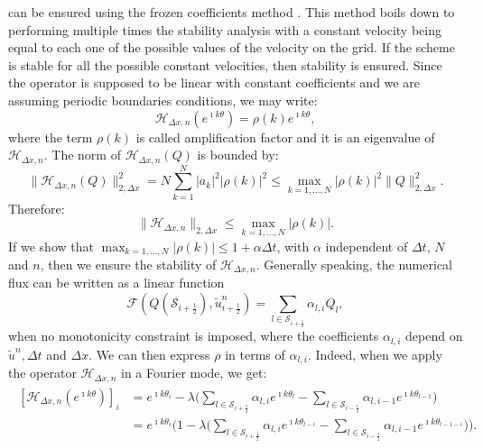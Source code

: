 can be ensured using the frozen coefficients method \citep[p.~59]{strikwerda:2004}.
This method boils down to performing multiple times the stability analysis with a constant velocity
being equal to each one of the possible values of the velocity on the grid.
If the scheme is stable for all the possible constant velocities, then stability is ensured.
Since the operator is supposed to be linear with constant coefficients and we
are assuming periodic boundaries conditions, we may write:
\begin{equation*}
	\mathcal{H}_{\Delta x,n}(e^{\imath k \theta}) = \rho(k)  e^{\imath k \theta},
\end{equation*}
where the term $\rho(k)$ is called amplification factor and it is an eigenvalue of $\mathcal{H}_{\Delta x,n}$.
The norm of $\mathcal{H}_{\Delta x,n}(Q)$ is bounded by:
\begin{equation*}
	\|\mathcal{H}_{\Delta x,n}(Q)\|_{2,\Delta x}^2 = N \sum_{k=1}^{N} |a_k|^2 |\rho(k)|^2 \leq 
	\max_{k=1, \ldots, N}{|\rho(k)|}^2 \|Q\|_{2,\Delta x}^2.
\end{equation*}
Therefore:
\begin{equation*}
	\|\mathcal{H}_{\Delta x,n}\|_{2,\Delta x} \leq \max_{k=1, \ldots, N}{|\rho(k)|}.
\end{equation*}
If we show that $\max_{k=1, \ldots, N}{|\rho(k)|} \leq 1 + \alpha \Delta t$, 
with $\alpha$ independent of $\Delta t$, $N$ and $n$, then we ensure the stability of $\mathcal{H}_{\Delta x,n}$.
Generally speaking, the numerical flux can be written as a linear function
\begin{equation*}
	\mathcal{F}(Q(\mathcal{S}_{i+\frac{1}{2}}), \tilde{u}^n_{i+\frac{1}{2}}) = \sum_{l \in \mathcal{S}_{i+\frac{1}{2}}} \alpha_{l,i} Q_{l}, 
\end{equation*}
when no monotonicity constraint is imposed, 
where the coefficients $\alpha_{l,i}$ depend on $\tilde{u}^n, \Delta t$ and $\Delta x$.
We can then express $\rho$ in terms of $\alpha_{l,i}$.
Indeed, when we apply the operator $\mathcal{H}_{\Delta x,n}$ in a Fourier mode, we get:
\begin{align*}
	\begin{split}
		[\mathcal{H}_{\Delta x,n}(e^{\imath k\theta})]_i &= e^{\imath k\theta_i} - \lambda 
		\bigg(\sum_{l \in \mathcal{S}_{i+\frac{1}{2}}} \alpha_{l,i}   e^{\imath k\theta_{l}} - 
		\sum_{l \in \mathcal{S}_{i-\frac{1}{2}}} \alpha_{l,i-1} e^{\imath k\theta_{l-1}} \bigg)\\
		&= e^{\imath k \theta_i}\bigg(1 - \lambda 
		\bigg(\sum_{l \in \mathcal{S}_{i+\frac{1}{2}}} \alpha_{l,i}   e^{\imath k\theta_{l-i}} - 
		\sum_{l \in \mathcal{S}_{i-\frac{1}{2}}} \alpha_{l,i-1} e^{\imath k\theta_{l-1-i}} \bigg) \bigg).\\
	\end{split}
\end{align*}
